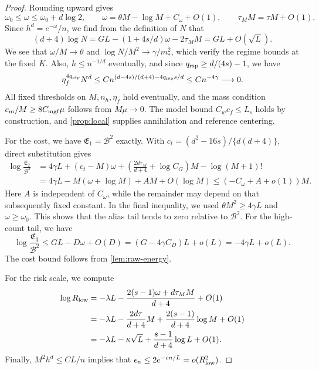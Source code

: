 \begin{proof}
Rounding upward gives
\begin{equation}\label{eq:LB-omega}
 \omega_0\le\omega\le\omega_0+d\log2,\qquad
 \omega=\theta M-\log M+C_\omega+O(1),
 \qquad\tau_MM=\tau M+O(1).
\end{equation}
Since $h^d=e^{-\omega}/n$, we find from the definition of $N$ that
\begin{equation}\label{eq:LB-N}
 (d+4)\log N=GL-(1+4s/d)\omega-2\tau_MM
 =GL+O(\sqrt L).
\end{equation}
We see that $\omega/M\to\theta$ and $\log N/M^2\to\gamma/m_*^2$,
which verify the regime bounds at the fixed $K$. Also, $h\le n^{-1/d}$
eventually, and since $q_{\rm rsp}\ge d/(4s)-1$, we have
\[
 \eta_f^{4q_{\rm rsp}}N^d
 \le Cn^{(d-4s)/(d+4)-4q_{\rm rsp}s/d}
 \le Cn^{-4\gamma}\longrightarrow0.
\]
All fixed thresholds on $M,n_h,\eta_f$ hold eventually, and the mass
condition $c_m/M\ge8C_{\rm mgf}\mu$ follows from $M\mu\to0$.
The model bound $C_wc_f\le L_s$ holds by construction, and
\cref{prop:local} supplies annihilation and reference centering.

For the cost, we have $\mathfrak E_1=\mathcal B^2$ exactly.
With $c_t=(d^2-16s)/\{d(d+4)\}$, direct substitution gives
\begin{equation}\label{eq:LB-T2}
\begin{aligned}
 \log\frac{\mathfrak E_2}{\mathcal B^2}
 &=4\gamma L+(c_t-M)\omega+
 \left(\frac{2d\tau_M}{d+4}+\log C_G\right)M-\log(M+1)!\\
 &=4\gamma L-M(\omega+\log M)+AM+O(\log M)
 \le(-C_\omega+A+o(1))M.
\end{aligned}
\end{equation}
Here $A$ is independent of $C_\omega$, while the remainder may depend
on that subsequently fixed constant. In the final inequality, we used
$\theta M^2\ge4\gamma L$ and $\omega\ge\omega_0$. This shows that the
alias tail tends to zero relative to $\mathcal B^2$.
For the high-count tail, we have
\[
 \log\frac{\mathfrak E_3}{\mathcal B^2}
 \le GL-D\omega+O(D)
 =(G-4\gamma C_D)L+o(L)=-4\gamma L+o(L).
\]
The cost bound follows from \cref{lem:raw-energy}.

For the risk scale, we compute
\begin{equation}\label{eq:LB-saddle}
\begin{aligned}
 \log R_{\rm low}
 &=-\lambda L-\frac{2(s-1)\omega+d\tau_MM}{d+4}+O(1)\\
 &=-\lambda L-\frac{2d\tau}{d+4}M
   +\frac{2(s-1)}{d+4}\log M+O(1)\\
 &=-\lambda L-\kappa\sqrt L+\frac{s-1}{d+4}\log L+O(1).
\end{aligned}
\end{equation}
Finally, $M^2h^d\le CL/n$ implies that
$\epsilon_n\le2e^{-cn/L}=o(R_{\rm low}^2)$.
\end{proof}

